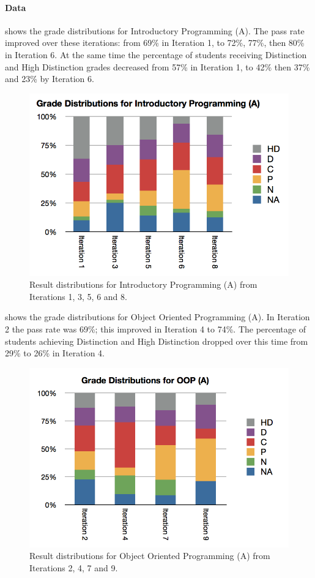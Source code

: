 
\paragraph{Data} %
\label{ssub:data_3_6}

 shows the grade distributions for Introductory Programming (A). The pass rate improved over these iterations: from 69\% in Iteration 1, to 72\%, 77\%, then 80\% in Iteration 6. At the same time the percentage of students receiving Distinction and High Distinction grades decreased from 57\% in Iteration 1, to 42\% then 37\% and 23\% by Iteration 6.

\begin{figure}[htbp]
  \centering
  \includegraphics[width=0.8\columnwidth]{IntroProgA}
  \caption{Result distributions for Introductory Programming (A) from Iterations 1, 3, 5, 6 and 8.}
  \label{fig:intro_prog_1_9}
\end{figure}

 shows the grade distributions for Object Oriented Programming (A). In Iteration 2 the pass rate was 69\%; this improved in Iteration 4 to 74\%. The percentage of students achieving Distinction and High Distinction dropped over this time from 29\% to 26\% in Iteration 4.

\begin{figure}[htbp]
  \centering
  \includegraphics[width=0.8\columnwidth]{OOPA}
  \caption{Result distributions for Object Oriented Programming (A) from Iterations 2, 4, 7 and 9.}
  \label{fig:oop_1_9}
\end{figure}

